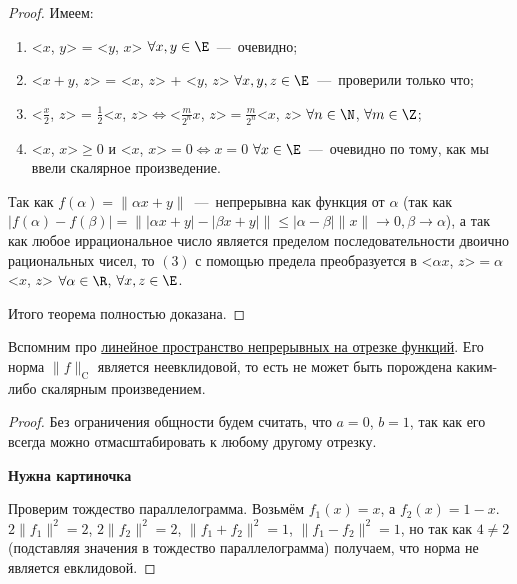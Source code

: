 \begin{proof}
    Имеем:
    \begin{enumerate}
        \item <$x$, $y$> = <$y$, $x$> $\forall x, y \in \E$~---~очевидно;
        \item <$x + y$, $z$> = <$x$, $z$> + <$y$, $z$> $\forall x, y, z \in \E$~---~проверили только что;
        \item <$\frac{x}{2}$, $z$> = $\frac{1}{2}$<$x$, $z$>$ \Leftrightarrow$<$\frac{m}{2^n} x$, $z$>$ = \frac{m}{2^n}$<$x$, $z$> $\forall n \in \N$, $\forall m \in \Z$;
        \item <$x$, $x$>$ \geq 0$ и <$x$, $x$>$ = 0 \Leftrightarrow x = 0$ $\forall x \in \E$~---~очевидно по тому, как мы ввели скалярное произведение.
    \end{enumerate}
    Так как $f (\alpha) = \|\alpha x + y\|$~---~непрерывна как функция от $\alpha$ (так как $|f (\alpha) - f (\beta)| = \left\| |\alpha x + y| - |\beta x + y| \right\| \leq |\alpha - \beta| \| x\|\to 0, \beta \to \alpha$), а так как любое иррациональное число является пределом последовательности двоично рациональных чисел, то $(3)$ с помощью предела преобразуется в <$\alpha x$, $z$>$ = \alpha$<$x$, $z$> $\forall \alpha \in \R$, $\forall x, z \in \E$.

    Итого теорема полностью доказана.
\end{proof}
\begin{proposition}
    Вспомним про \hyperlink{examp7.1}{линейное пространство непрерывных на отрезке функций}. Его норма $\| f\|_{\text{C}}$ является неевклидовой, то есть не может быть порождена каким-либо скалярным произведением.
\end{proposition}
\begin{proof}
    Без ограничения общности будем считать, что $a = 0$, $b = 1$, так как его всегда можно отмасштабировать к любому другому отрезку.
    
    \textbf{Нужна картиночка}

    Проверим тождество параллелограмма. Возьмём $f_{1}(x) = x$, а $f_{2}(x) = 1 - x$. $2 \| f_{1} \|^2 = 2$, $2 \| f_{2} \|^2 = 2$, $\| f_{1} + f_{2}\|^2 = 1$, $\| f_{1} - f_{2}\|^{2} = 1$, но так как $4 \neq 2$ (подставляя значения в тождество параллелограмма) получаем, что норма не является евклидовой.
\end{proof}


